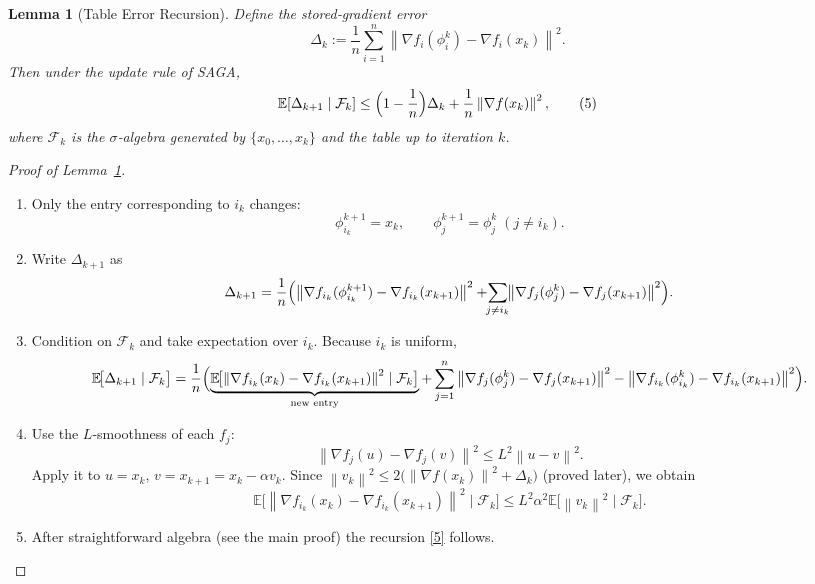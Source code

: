 \documentclass{article}
\newtheorem{lemma}{Lemma}
\newcommand{\EE}{\mathbb{E}}
\newcommand{\norm}[1]{\left\|#1\right\|}
\begin{document}
\begin{lemma}[Table Error Recursion]\label{lem:table}
Define the stored‑gradient error
\[
\Delta_k:=\frac{1}{n}\sum_{i=1}^{n}\norm{\nabla f_i(\phi_i^{k})-\nabla f_i(x_k)}^{2}.
\]
Then under the update rule of SAGA,
\[
\EE[\Delta_{k+1}\mid \mathcal{F}_k]
    \le\Bigl(1-\frac{1}{n}\Bigr)\Delta_k
      +\frac{1}{n}\norm{\nabla f(x_k)}^{2},
\tag{5}
\]
where $\mathcal{F}_k$ is the $\sigma$‑algebra generated by
$\{x_0,\dots,x_k\}$ and the table up to iteration $k$.
\end{lemma}
\begin{proof}[Proof of Lemma~\ref{lem:table}]
\begin{enumerate}
\item[Step 1.]  Only the entry corresponding to $i_k$ changes:
\[
\phi_{i_k}^{k+1}=x_k,\qquad
\phi_{j}^{k+1}=\phi_{j}^{k}\;(j\neq i_k).
\]
\item[Step 2.]  Write $\Delta_{k+1}$ as
\[
\Delta_{k+1}
 =\frac{1}{n}\Bigl(\norm{\nabla f_{i_k}(\phi_{i_k}^{k+1})-
                 \nabla f_{i_k}(x_{k+1})}^{2}
                 +\!\!\sum_{j\neq i_k}\!\!
                 \norm{\nabla f_{j}(\phi_{j}^{k})-
                 \nabla f_{j}(x_{k+1})}^{2}\Bigr).
\]
\item[Step 3.]  Condition on $\mathcal{F}_k$ and take expectation over $i_k$.
   Because $i_k$ is uniform,
\[
\EE\!\bigl[\Delta_{k+1}\mid \mathcal{F}_k\bigr]
 =\frac{1}{n}\Bigl(\underbrace{\EE\!\bigl[
        \norm{\nabla f_{i_k}(x_k)-\nabla f_{i_k}(x_{k+1})}^{2}
        \mid\mathcal{F}_k\bigr]}_{\text{new entry}}
   +\sum_{j=1}^{n}\norm{\nabla f_{j}(\phi_{j}^{k})-
                 \nabla f_{j}(x_{k+1})}^{2}
   -\norm{\nabla f_{i_k}(\phi_{i_k}^{k})-
                 \nabla f_{i_k}(x_{k+1})}^{2}\Bigr).
\]
\item[Step 4.]  Use the $L$‑smoothness of each $f_j$:
\[
\norm{\nabla f_j(u)-\nabla f_j(v)}^{2}
   \le L^{2}\norm{u-v}^{2}.
\]
   Apply it to $u=x_k$, $v=x_{k+1}=x_k-\alpha v_k$.
   Since $\norm{v_k}^{2}\le 2\bigl(\norm{\nabla f(x_k)}^{2}
      +\Delta_k\bigr)$ (proved later), we obtain
\[
\EE\!\bigl[\norm{\nabla f_{i_k}(x_k)-\nabla f_{i_k}(x_{k+1})}^{2}
          \mid\mathcal{F}_k\bigr]
 \le L^{2}\alpha^{2}\EE\!\bigl[\norm{v_k}^{2}\mid\mathcal{F}_k\bigr].
\]
\item[Step 5.]  After straightforward algebra (see the main proof) the
   recursion \eqref{5} follows.
\end{enumerate}
\end{proof}

\end{document}
